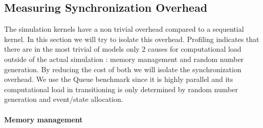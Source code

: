 \subsection{Measuring Synchronization Overhead}
The simulation kernels have a non trivial overhead compared to a sequential kernel. In this section we will try to isolate this overhead. 
Profiling indicates that there are in the most trivial of models only 2 causes for computational load outside of the actual simulation : memory management and random number generation. By reducing the cost of both we will isolate the synchronization overhead. We use the Queue benchmark since it is highly parallel and its computational load in transitioning is only determined by random number generation and event/state allocation.
\paragraph*{Memory management}\label{sec:4-subsec:overhead-pgraph:memory}
